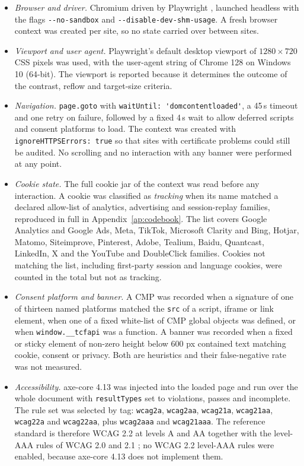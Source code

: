 \documentclass[pdflatex,sn-basic,Numbered]{sn-jnl}
\theoremstyle{thmstyleone}
\theoremstyle{thmstyletwo}
\theoremstyle{thmstylethree}
\begin{document}
\begin{itemize}
	\item \emph{Browser and driver.} Chromium driven by Playwright \citep{playwright2026}, launched headless with the flags \verb|--no-sandbox| and \verb|--disable-dev-shm-usage|. A fresh browser context was created per site, so no state carried over between sites.
	\item \emph{Viewport and user agent.} Playwright's default desktop viewport of $1280 \times 720$ CSS pixels was used, with the user-agent string of Chrome 128 on Windows 10 (64-bit). The viewport is reported because it determines the outcome of the contrast, reflow and target-size criteria.
	\item \emph{Navigation.} \verb|page.goto| with \verb|waitUntil: 'domcontentloaded'|, a 45\,s timeout and one retry on failure, followed by a fixed 4\,s wait to allow deferred scripts and consent platforms to load. The context was created with \verb|ignoreHTTPSErrors: true| so that sites with certificate problems could still be audited. No scrolling and no interaction with any banner were performed at any point.
	\item \emph{Cookie state.} The full cookie jar of the context was read before any interaction. A cookie was classified as \emph{tracking} when its name matched a declared allow-list of analytics, advertising and session-replay families, reproduced in full in Appendix~\ref{ap:codebook}. The list covers Google Analytics and Google Ads, Meta, TikTok, Microsoft Clarity and Bing, Hotjar, Matomo, Siteimprove, Pinterest, Adobe, Tealium, Baidu, Quantcast, LinkedIn, X and the YouTube and DoubleClick families. Cookies not matching the list, including first-party session and language cookies, were counted in the total but not as tracking.
	\item \emph{Consent platform and banner.} A CMP was recorded when a signature of one of thirteen named platforms matched the \verb|src| of a script, iframe or link element, when one of a fixed white-list of CMP global objects was defined, or when \verb|window.__tcfapi| was a function. A banner was recorded when a fixed or sticky element of non-zero height below 600 px contained text matching cookie, consent or privacy. Both are heuristics and their false-negative rate was not measured.
	\item \emph{Accessibility.} axe-core 4.13 \citep{axecore2026} was injected into the loaded page and run over the whole document with \verb|resultTypes| set to violations, passes and incomplete. The rule set was selected by tag: \verb|wcag2a|, \verb|wcag2aa|, \verb|wcag21a|, \verb|wcag21aa|, \verb|wcag22a| and \verb|wcag22aa|, plus \verb|wcag2aaa| and \verb|wcag21aaa|. The reference standard is therefore WCAG 2.2 at levels A and AA \citep{wcag22} together with the level-AAA rules of WCAG 2.0 and 2.1 \citep{wcag21}; no WCAG 2.2 level-AAA rules were enabled, because axe-core 4.13 does not implement them.

\end{itemize}
\end{document}
